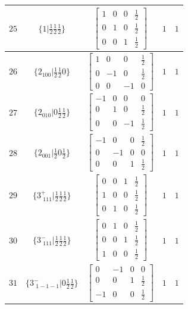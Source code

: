 \documentclass[fleqn,8pt]{jsarticle}
\begin{document}
\begin{longtable}{ccccc}
$ 25 $ & $ \{1|\frac{1}{2} \frac{1}{2} \frac{1}{2}\} $ & $ \begin{bmatrix} 1 & 0 & 0 & \frac{1}{2} \\ 0 & 1 & 0 & \frac{1}{2} \\ 0 & 0 & 1 & \frac{1}{2} \end{bmatrix} $ & $ 1 $ & $ 1 $ \\ \hline
$ 26 $ & $ \{2{}_{100}|\frac{1}{2} \frac{1}{2} 0\} $ & $ \begin{bmatrix} 1 & 0 & 0 & \frac{1}{2} \\ 0 & -1 & 0 & \frac{1}{2} \\ 0 & 0 & -1 & 0 \end{bmatrix} $ & $ 1 $ & $ 1 $ \\ \hline
$ 27 $ & $ \{2{}_{010}|0 \frac{1}{2} \frac{1}{2}\} $ & $ \begin{bmatrix} -1 & 0 & 0 & 0 \\ 0 & 1 & 0 & \frac{1}{2} \\ 0 & 0 & -1 & \frac{1}{2} \end{bmatrix} $ & $ 1 $ & $ 1 $ \\ \hline
$ 28 $ & $ \{2{}_{001}|\frac{1}{2} 0 \frac{1}{2}\} $ & $ \begin{bmatrix} -1 & 0 & 0 & \frac{1}{2} \\ 0 & -1 & 0 & 0 \\ 0 & 0 & 1 & \frac{1}{2} \end{bmatrix} $ & $ 1 $ & $ 1 $ \\ \hline
$ 29 $ & $ \{3^{+}_{\,\,111}|\frac{1}{2} \frac{1}{2} \frac{1}{2}\} $ & $ \begin{bmatrix} 0 & 0 & 1 & \frac{1}{2} \\ 1 & 0 & 0 & \frac{1}{2} \\ 0 & 1 & 0 & \frac{1}{2} \end{bmatrix} $ & $ 1 $ & $ 1 $ \\ \hline
$ 30 $ & $ \{3^{-}_{\,\,111}|\frac{1}{2} \frac{1}{2} \frac{1}{2}\} $ & $ \begin{bmatrix} 0 & 1 & 0 & \frac{1}{2} \\ 0 & 0 & 1 & \frac{1}{2} \\ 1 & 0 & 0 & \frac{1}{2} \end{bmatrix} $ & $ 1 $ & $ 1 $ \\ \hline
$ 31 $ & $ \{3^{-}_{\,\,1-1-1}|0 \frac{1}{2} \frac{1}{2}\} $ & $ \begin{bmatrix} 0 & -1 & 0 & 0 \\ 0 & 0 & 1 & \frac{1}{2} \\ -1 & 0 & 0 & \frac{1}{2} \end{bmatrix} $ & $ 1 $ & $ 1 $ \\ \hline

\end{longtable}
\end{document}
